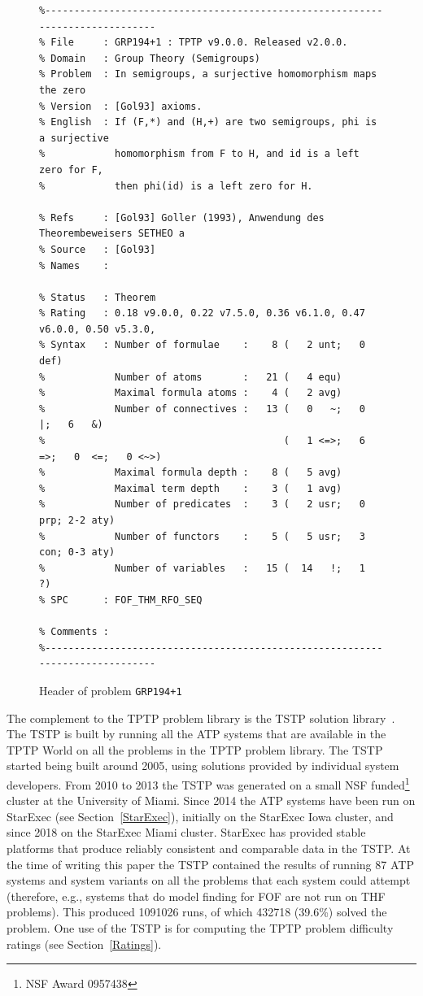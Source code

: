 \documentclass[runningheads]{llncs}
\begin{document}
\begin{figure}[htb]
\centering
{\scriptsize
{\setlength{\baselineskip}{2.5mm}
\begin{verbatim}
%------------------------------------------------------------------------------
% File     : GRP194+1 : TPTP v9.0.0. Released v2.0.0.
% Domain   : Group Theory (Semigroups)
% Problem  : In semigroups, a surjective homomorphism maps the zero
% Version  : [Gol93] axioms.
% English  : If (F,*) and (H,+) are two semigroups, phi is a surjective
%            homomorphism from F to H, and id is a left zero for F,
%            then phi(id) is a left zero for H.

% Refs     : [Gol93] Goller (1993), Anwendung des Theorembeweisers SETHEO a
% Source   : [Gol93]
% Names    :

% Status   : Theorem
% Rating   : 0.18 v9.0.0, 0.22 v7.5.0, 0.36 v6.1.0, 0.47 v6.0.0, 0.50 v5.3.0, 
% Syntax   : Number of formulae    :    8 (   2 unt;   0 def)
%            Number of atoms       :   21 (   4 equ)
%            Maximal formula atoms :    4 (   2 avg)
%            Number of connectives :   13 (   0   ~;   0   |;   6   &)
%                                         (   1 <=>;   6  =>;   0  <=;   0 <~>)
%            Maximal formula depth :    8 (   5 avg)
%            Maximal term depth    :    3 (   1 avg)
%            Number of predicates  :    3 (   2 usr;   0 prp; 2-2 aty)
%            Number of functors    :    5 (   5 usr;   3 con; 0-3 aty)
%            Number of variables   :   15 (  14   !;   1   ?)
% SPC      : FOF_THM_RFO_SEQ

% Comments :
%------------------------------------------------------------------------------
\end{verbatim}
}}
\caption{Header of problem {\tt GRP194+1}}
\label{ExampleHeader}
\end{figure}

The complement to the TPTP problem library is the TSTP solution library~\cite{Sut07-CSR,Sut10}.
The TSTP is built by running all the ATP systems that are available in the TPTP World on
all the problems in the TPTP problem library.
The TSTP started being built around 2005, using solutions provided by individual system developers.
From 2010 to 2013 the TSTP was generated on a small NSF funded\footnote{%
NSF Award 0957438} cluster at the University of Miami.
Since 2014 the ATP systems have been run on StarExec (see Section~\ref{StarExec}), initially on 
the StarExec Iowa cluster, and since 2018 on the StarExec Miami cluster.
StarExec has provided stable platforms that produce reliably consistent and comparable data in 
the TSTP.
At the time of writing this paper the TSTP contained the results of running 87 ATP systems and 
system variants on all the problems that each system could attempt
(therefore, e.g., systems that do model finding for FOF are not run on THF problems).
This produced 1091026 runs, of which 432718 (39.6\%) solved the problem.
One use of the TSTP is for computing the TPTP problem difficulty ratings (see 
Section~\ref{Ratings}).
\end{document}
